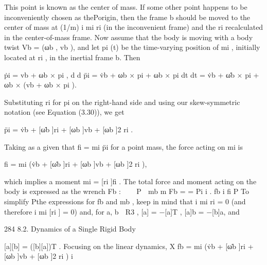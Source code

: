 \documentclass[12pt,a4paper]{article}
\begin{document}
This point is known as the center of mass. If some other point happens to
be inconveniently chosen as thePorigin, then the frame {b} should be moved
to the center of mass at (1/m) i mi ri (in the inconvenient frame) and the ri
recalculated in the center-of-mass frame.
    Now assume that the body is moving with a body twist Vb = (ωb , vb ), and
let pi (t) be the time-varying position of mi , initially located at ri , in the inertial
frame {b}. Then

                          ṗi = vb + ωb × pi ,
                                       d                  d
                          p̈i = v̇b + ωb × pi + ωb × pi
                                      dt                 dt
                              = v̇b + ω̇b × pi + ωb × (vb + ωb × pi ).

Substituting ri for pi on the right-hand side and using our skew-symmetric
notation (see Equation (3.30)), we get

                              p̈i = v̇b + [ω̇b ]ri + [ωb ]vb + [ωb ]2 ri .

Taking as a given that fi = mi p̈i for a point mass, the force acting on mi is

                           fi = mi (v̇b + [ω̇b ]ri + [ωb ]vb + [ωb ]2 ri ),

which implies a moment
                                            mi = [ri ]fi .
The total force and moment acting on the body is expressed as the wrench Fb :
                                       P            
                                  mb             m
                          Fb =          = Pi i .
                                  fb            i fi
                                                                       P
   To simplify Pthe expressions for fb and mb , keep in mind that i mi ri = 0
(and therefore i mi [ri ] = 0) and, for a, b ∈ R3 , [a] = −[a]T , [a]b = −[b]a, and


284                                                           8.2. Dynamics of a Single Rigid Body

[a][b] = ([b][a])T . Focusing on the linear dynamics,
                    X
              fb =     mi (v̇b + [ω̇b ]ri + [ωb ]vb + [ωb ]2 ri )
                        i
\end{document}
